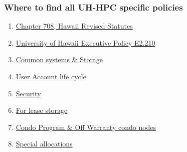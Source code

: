 \begin{frame}
\frametitle{Where to find all UH-HPC specific policies}
\begin{enumerate}
\item \href{http://www.hawaii.edu/infotech/policies/itpolicy.html\#appendixa}{Chapter 708, Hawaii Revised Statutes}
\item \href{http://www.hawaii.edu/infotech/policies/itpolicy.html}{University of Hawaii Executive Policy E2.210}
\item \href{http://go.hawaii.edu/GSY}{Common systems \& Storage}
\item \href{http://go.hawaii.edu/0SG}{User Account life cycle}
\item \href{http://go.hawaii.edu/WSG}{Security}
\item \href{http://go.hawaii.edu/YKG}{For lease storage}
\item \href{http://go.hawaii.edu/GK0}{Condo Program \& Off Warranty condo nodes}
\item \href{https://docs.google.com/document/d/1mGcCAsmzGT_hWXLcUNfT2LUwiggCnhqrln32k0IGZZI/}{Special allocations}
\end{enumerate}
\end{frame}
%

